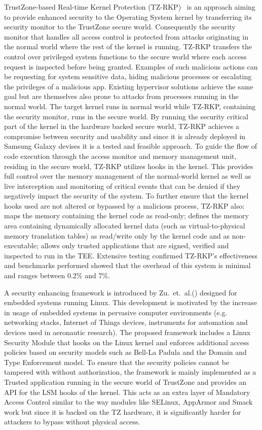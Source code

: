 \documentclass[cameraready]{cseminar}
\begin{document}
TrustZone-based Real-time Kernel Protection (TZ-RKP)~\cite{hypervision} is an approach aiming to provide enhanced security to the Operating System kernel by transferring its security monitor to the TrustZone secure world. Consequently the security monitor that handles all access control is protected from attacks originating in the normal world where the rest of the kernel is running. TZ-RKP transfers the control over privileged system functions to the secure world where each access request is inspected before being granted. Examples of such malicious actions can be requesting for system sensitive data, hiding malicious processes or escalating the privileges of a malicious app. Existing hypervisor solutions achieve the same goal but are themselves also prone to attacks from processes running in the normal world. The target kernel runs in normal world while TZ-RKP, containing the security monitor, runs in the secure world. By running the security critical part of the kernel in the hardware backed secure world, TZ-RKP achieves a compromise between security and usability and since it is already deployed in Samsung Galaxy devises it is a tested and feasible approach. To guide the flow of code execution through the access monitor and memory management unit, residing in the secure world, TZ-RKP utilizes hooks in the kernel. This provides full control over the memory management of the normal-world kernel as well as live interception and monitoring of critical events that can be denied if they negatively impact the security of the system. To further ensure that the kernel hooks used are not altered or bypassed by a malicious process, TZ-RKP also: maps the memory containing the kernel code as read-only; defines the memory area containing dynamically allocated kernel data (such as virtual-to-physical memory translation tables) as read/write only by the kernel code and as non-executable; allows only trusted applications that are signed, verified and inspected to run in the TEE.  Extensive testing confirmed TZ-RKP's effectiveness and benchmarks performed showed that the overhead of this system is minimal  and ranges between 0.2\% and 7\%.

A security enhancing framework is introduced by Zu.~et.~al.(\cite{designembedded}) designed for embedded systems running Linux. This development is motivated by the increase in usage of embedded systems in pervasive computer environments (e.g. networking stacks, Internet of Things devices, instruments for automation and devices used in aeronautic research). The proposed framework includes a Linux Security Module that hooks on the Linux kernel and enforces additional access policies based on security models such as Bell-La Padula and the Domain and Type Enforcement model. To ensure that the security policies cannot be tampered with without authorization, the framework is mainly implemented as a Trusted application running in the secure world of TrustZone and provides an API for the LSM hooks of the kernel. This acts as an extra layer of Mandatory Access Control similar to the way modules like SELinux, AppArmor and Smack work but since it is backed on the TZ hardware, it is significantly harder for attackers to bypass without physical access.
 
\end{document}

